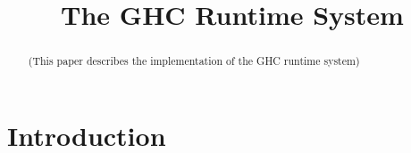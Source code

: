 \documentclass{jfp1}
\title{The GHC Runtime System}
\begin{document}
\maketitle

\begin{abstract}
(This paper describes the implementation of the GHC runtime system)
\end{abstract}

\tableofcontents

\section{Introduction}




\end{document}
